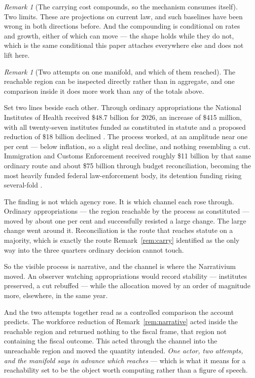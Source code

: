 \documentclass[11pt,a4paper]{article}
\theoremstyle{remark}
\newtheorem{remark}[definition]{Remark}
\begin{document}
\begin{remark}[The carrying cost compounds, so the mechanism consumes itself]
Two limits. These are projections on current law, and such baselines have been wrong in both
directions before. And the compounding is conditional on rates and growth, either of which can move ---
the shape holds while they do not, which is the same conditional this paper attaches everywhere
else and does not lift here.
\end{remark}

\begin{remark}[Two attempts on one manifold, and which of them reached]\label{rem:channel}
The reachable region can be inspected directly rather than in aggregate, and one comparison inside it
does more work than any of the totals above.

Set two lines beside each other. Through ordinary appropriations the National Institutes of Health
received \$48.7 billion for 2026, an increase of \$415 million, with all twenty-seven institutes funded
as constituted in statute and a proposed reduction of \$18 billion declined \citep{crsnih}. The
process worked, at an amplitude near one per cent --- below inflation, so a slight real decline, and
nothing resembling a cut. Immigration and Customs Enforcement received roughly \$11 billion by that same
ordinary route and about \$75 billion through budget reconciliation, becoming the most heavily funded
federal law-enforcement body, its detention funding rising several-fold \citep{cborecon}.

The finding is not which agency rose. It is which channel each rose through. Ordinary
appropriations --- the region reachable by the process as constituted --- moved by about one per cent and
successfully resisted a large change. The large change went around it. Reconciliation is the route
that reaches statute on a majority, which is exactly the route Remark~\ref{rem:carry} identified as the
only way into the three quarters ordinary decision cannot touch.

So the visible process is narrative, and the channel is where the Narrativium moved. An observer
watching appropriations would record stability --- institutes preserved, a cut rebuffed --- while the
allocation moved by an order of magnitude more, elsewhere, in the same year.

And the two attempts together read as a controlled comparison the account predicts. The workforce
reduction of Remark~\ref{rem:narrative} acted inside the reachable region and returned nothing to the
fiscal frame, that region not containing the fiscal outcome. This acted through the channel into the
unreachable region and moved the quantity intended. \emph{One actor, two attempts, and the manifold says
in advance which reaches} --- which is what it means for a reachability set to be the object worth
computing rather than a figure of speech.


\end{remark}
\end{document}
